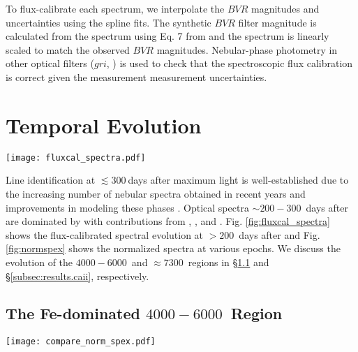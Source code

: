 \documentclass[twocolumn]{aastex63}
\begin{document}
To flux-calibrate each spectrum, we interpolate the $BVR$ magnitudes and uncertainties using the spline fits. The synthetic $BVR$ filter magnitude is calculated from the spectrum using Eq. 7 from \citet{fukugita1996} and the spectrum is linearly scaled to match the observed $BVR$ magnitudes. Nebular-phase photometry in other optical filters ($gri$, \citealp{firth2015, kerzendorf2014, kerzendorf2017}) is used to check that the spectroscopic flux calibration is correct given the measurement measurement uncertainties. 

\section{Temporal Evolution}\label{sec:results}

\begin{figure*}
    \centering
    \texttt{[image: fluxcal\_spectra.pdf]}
    \caption{Flux-calibrated spectroscopic evolution of \name at $>200$ days after maximum light. Error bars along the right axis represent typical flux-calibration uncertainties after the $BVR$ spline fits (see \S\ref{sec:data}). The gray hatched region marks the O$_2$ A-band telluric feature.}
    \label{fig:fluxcal_spectra}
\end{figure*}

Line identification at $\lesssim 300~$days after maximum light is well-established due to the increasing number of nebular spectra obtained in recent years \citep[e.g., ][]{graham2017, maguire2018, sand2018, tucker2020} and improvements in modeling these phases \citep[e.g., ][]{mazzali2015, flors2018, wilk2018, flors2020, wilk2020, shingles2020, polin2021}. Optical spectra $\sim 200-300$~days after \tmax are dominated by  with contributions from , , and . Fig. \ref{fig:fluxcal_spectra} shows the flux-calibrated spectral evolution at $>200$~days after \tmax and Fig. \ref{fig:normspex} shows the normalized spectra at various epochs. We discuss the evolution of the $4000-6000$~\AAA and $\approx 7300$~\AAA regions in \S\ref{subsec:results.feblend} and \S\ref{subsec:results.caii}, respectively.

\subsection{The Fe-dominated $4000-6000$~\AAA Region}\label{subsec:results.feblend}

\begin{figure*}
    \centering
    \texttt{[image: compare\_norm\_spex.pdf]}
    \caption{Spectroscopic comparison at various epochs using the same color scheme as Fig. \ref{fig:fluxcal_spectra} but normalized by the mean flux near $5300$~\AAA. Dominant line identifications before and after the distinct ionization transition at $\sim 500$~days are given in black and gray, respectively. Lines with a `?' indicate that the line's contribution to the observed spectral feature is unclear. Fe emission lines after the ionization transition are likely blends of forbidden and permitted transitions \citep{fransson2015} but we omit the bracket notation for visual clarity.}
    \label{fig:normspex}
\end{figure*}
\end{document}
